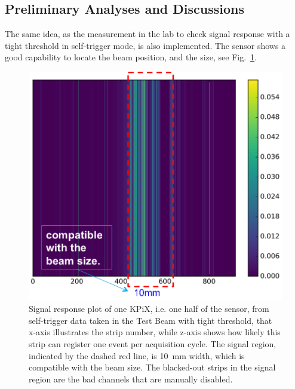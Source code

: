 \documentclass[journal]{IEEEtran}
\begin{document}
\subsection*{Preliminary Analyses and Discussions}

The same idea, as the measurement in the lab to check signal response with a tight threshold in self-trigger mode, is also implemented.
The sensor shows a good capability to locate the beam position, and the size, see Fig.~\ref{fig:tb1}.
\begin{figure}[!ht]%
  \centering
  \includegraphics[width=0.75\linewidth]{pics/tb_1.png}
  \caption{Signal response plot of one KPiX, i.e. one half of the sensor, from self-trigger data taken in the Test Beam with tight threshold,
  that x-axis illustrates the strip number, while z-axis shows how likely this strip can register one event per acquisition cycle.
  The signal region, indicated by the dashed red line, is \SI{10}{mm} width, which is compatible with the beam size.
  The blacked-out strips in the signal region are the bad channels that are manually disabled. }%
\label{fig:tb1}%
\end{figure}
\end{document}

